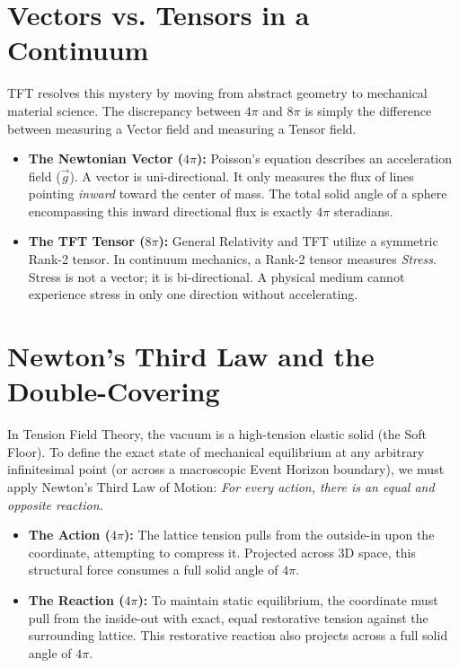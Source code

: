 \section{Vectors vs. Tensors in a Continuum}
TFT resolves this mystery by moving from abstract geometry to mechanical material science. The discrepancy between $4\pi$ and $8\pi$ is simply the difference between measuring a Vector field and measuring a Tensor field.

\begin{itemize}
    \item \textbf{The Newtonian Vector ($4\pi$):} Poisson's equation describes an acceleration field ($\vec{g}$). A vector is uni-directional. It only measures the flux of lines pointing \textit{inward} toward the center of mass. The total solid angle of a sphere encompassing this inward directional flux is exactly $4\pi$ steradians.
    \item \textbf{The TFT Tensor ($8\pi$):} General Relativity and TFT utilize a symmetric Rank-2 tensor. In continuum mechanics, a Rank-2 tensor measures \textit{Stress}. Stress is not a vector; it is bi-directional. A physical medium cannot experience stress in only one direction without accelerating.
\end{itemize}

\section{Newton's Third Law and the Double-Covering}
In Tension Field Theory, the vacuum is a high-tension elastic solid (the Soft Floor). To define the exact state of mechanical equilibrium at any arbitrary infinitesimal point (or across a macroscopic Event Horizon boundary), we must apply Newton's Third Law of Motion: \textit{For every action, there is an equal and opposite reaction.}

\begin{itemize}
    \item \textbf{The Action ($4\pi$):} The lattice tension pulls from the outside-in upon the coordinate, attempting to compress it. Projected across 3D space, this structural force consumes a full solid angle of $4\pi$.
    \item \textbf{The Reaction ($4\pi$):} To maintain static equilibrium, the coordinate must pull from the inside-out with exact, equal restorative tension against the surrounding lattice. This restorative reaction also projects across a full solid angle of $4\pi$.
\end{itemize}

